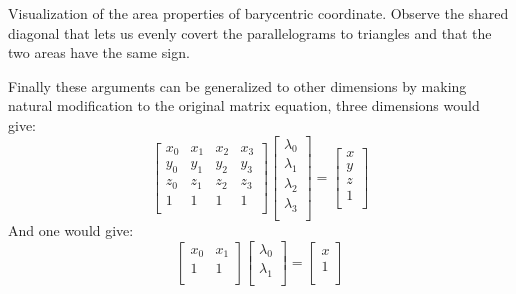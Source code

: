 \begin{center}

Visualization of the area properties of barycentric coordinate. 
Observe the shared diagonal that lets us evenly covert the parallelograms to triangles and that the two areas have the same sign.
\end{center}
Finally these arguments can be generalized to other dimensions by making natural modification to the original matrix equation,
three dimensions would give:
\[
\begin{bmatrix}
	x_0&x_1&x_2&x_3\\
	y_0&y_1&y_2&y_3\\
	z_0&z_1&z_2&z_3\\
	1&1&1&1\\
\end{bmatrix}
\begin{bmatrix}
	\lambda_0\\\lambda_1\\\lambda_2\\\lambda_3\\
\end{bmatrix}
=
\begin{bmatrix}
	x\\y\\z\\1\\
\end{bmatrix}
\]
And one would give:
\[
\begin{bmatrix}
	x_0&x_1\\
	1&1\\
\end{bmatrix}
\begin{bmatrix}
	\lambda_0\\\lambda_1\\
\end{bmatrix}
=
\begin{bmatrix}
	x\\1\\
\end{bmatrix}
\]

